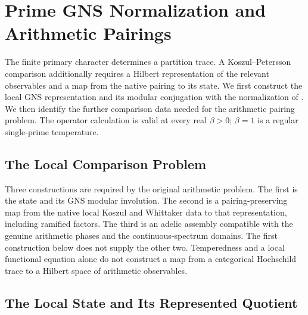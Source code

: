 \chapter{Prime GNS Normalization and Arithmetic Pairings}
\label{v4-arith:kms-gns-full}

The finite primary character determines a partition trace. A
Koszul--Petersson comparison additionally requires a Hilbert
representation of the relevant observables and a map from the
native pairing to its state. We first construct the local GNS
representation and its modular conjugation with the normalization
of . We then identify the further
comparison data needed for the arithmetic pairing problem.
The operator calculation is valid at every real $\beta>0$;
$\beta=1$ is a regular single-prime temperature.

\section{The Local Comparison Problem}
\label{v4-arith:kms-gns:statement-table}
\label{v4-arith:kms-gns:residuals}
\label{v4-arith:kms-gns:consequences}
\label{v4-arith:kms-gns:P3-consequence}
\label{v4-arith:kms-gns:table}

Three constructions are required by the original arithmetic
problem. The first is the state and its GNS modular involution.
The second is a pairing-preserving map from the native local
Koszul and Whittaker data to that representation, including
ramified factors. The third is an adelic assembly compatible
with the genuine arithmetic phases and the continuous-spectrum
domains. The first construction below does not supply the other
two. Temperedness and a local functional equation alone do not
construct a map from a categorical Hochschild trace to a Hilbert
space of arithmetic observables.

\section{The Local State and Its Represented Quotient}
\label{v4-arith:kms-gns:cycle1}
\label{v4-arith:kms-gns:cycle1:state}

